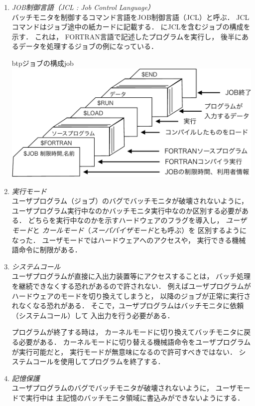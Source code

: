 \begin{enumerate}
\item \emph{JOB制御言語（JCL : Job Control Language）} \\
  バッチモニタを制御するコマンド言語をJOB制御言語（JCL）と呼ぶ．
  JCLコマンドはジョブ途中の紙カードに記載する．
  にJCLを含むジョブの構成を示す．
  これは，
  FORTRAN言語で記述したプログラムを実行し，
  後半にあるデータを処理するジョブの例になっている．

  \begin{myfig}{btp}{ジョブの構成}{job}
    \includegraphics[scale=0.6]{Fig/job-crop.pdf}
  \end{myfig}

\item \emph{実行モード} \\
  ユーザプログラム（ジョブ）のバグでバッチモニタが破壊されないように，
  ユーザプログラム実行中なのかバッチモニタ実行中なのか区別する必要がある．
  どちらを実行中なのかを示すハードウェアのフラグを導入し，
  \emph{ユーザモード}と
  \emph{カールモード}（\emph{スーパバイザモード}とも呼ぶ）を
  区別するようになった．
  ユーザモードではハードウェアへのアクセスや，
  実行できる機械語命令に制限がある．

\item \emph{システムコール} \\
  ユーザプログラムが直接に入出力装置等にアクセスすることは，
  バッチ処理を継続できなくする恐れがあるので許されない．
  例えばユーザプログラムがハードウェアのモードを切り換えてしまうと，
  以降のジョブが正常に実行されなくなる恐れがある．
  そこで，ユーザプログラムはバッチモニタに依頼（システムコール）して
  入出力を行う必要がある．

  プログラムが終了する時は，
  カーネルモードに切り換えてバッチモニタに戻る必要がある．
  カーネルモードに切り替える機械語命令をユーザプログラムが実行可能だと，
  実行モードが無意味になるので許可すべきではない．
  システムコールを使用してプログラムを終了する．

\item \emph{記憶保護} \\
  ユーザプログラムのバグでバッチモニタが破壊されないように，
  ユーザモードで実行中は
  主記憶のバッチモニタ領域に書込みができないようにする．
\end{enumerate}

